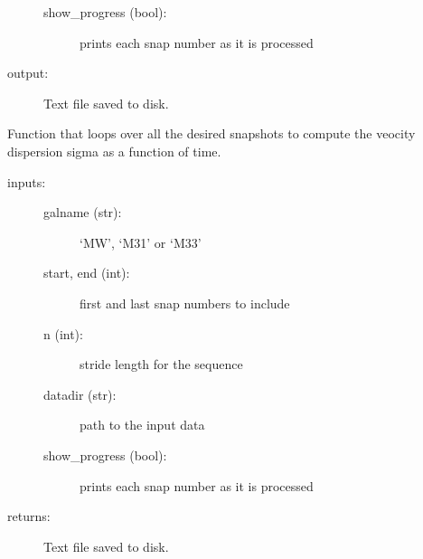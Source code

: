 \documentclass[letterpaper,10pt,english]{sphinxmanual}
\begin{document}
\begin{fulllineitems}
\begin{fulllineitems}
\begin{description}
\begin{description}
\item[{show\_progress (bool):}] \leavevmode
prints each snap number as it is processed

\end{description}

\item[{output: }] \leavevmode
Text file saved to disk.

\end{description}

\end{fulllineitems}


\begin{fulllineitems}
\label{\detokenize{timecourse:galaxy.timecourse.TimeCourse.write_vel_disp}}
Function that loops over all the desired snapshots to compute the veocity dispersion
sigma as a function of time.
\begin{description}
\item[{inputs:}] \leavevmode\begin{description}
\item[{galname (str):}] \leavevmode
‘MW’, ‘M31’ or ‘M33’

\item[{start, end (int):}] \leavevmode
first and last snap numbers to include

\item[{n (int):}] \leavevmode
stride length for the sequence

\item[{datadir (str):}] \leavevmode
path to the input data

\item[{show\_progress (bool):}] \leavevmode
prints each snap number as it is processed

\end{description}

\item[{returns: }] \leavevmode
Text file saved to disk.

\end{description}

\end{fulllineitems}



\end{fulllineitems}
\end{document}
